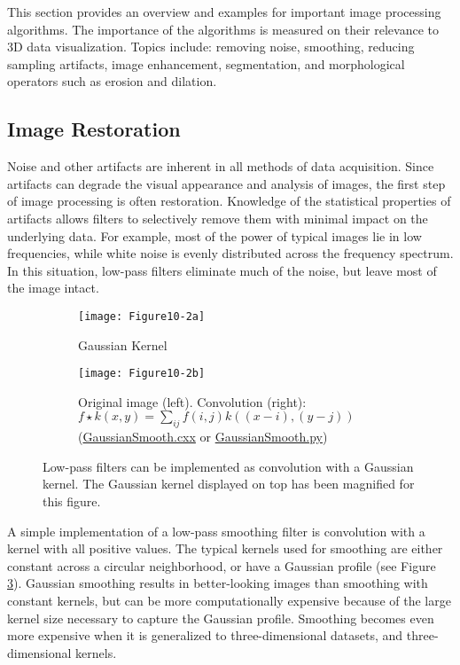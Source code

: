 This section provides an overview and examples for important image processing algorithms. The importance of the algorithms is measured on their relevance to 3D data visualization. Topics include: removing noise, smoothing, reducing sampling artifacts, image enhancement, segmentation, and morphological operators such as erosion and dilation.

\subsection{Image Restoration}

Noise and other artifacts are inherent in all methods of data acquisition. Since artifacts can degrade the visual appearance and analysis of images, the first step of image processing is often restoration. Knowledge of the statistical properties of artifacts allows filters to selectively remove them with minimal impact on the underlying data. For example, most of the power of typical images lie in low frequencies, while white noise is evenly distributed across the frequency spectrum. In this situation, low-pass filters eliminate much of the noise, but leave most of the image intact.

\begin{figure}[htb]
	\begin{subfigure}[h]{0.24\linewidth}
		\texttt{[image: Figure10-2a]}
		\captionsetup{justification=centering}
		\caption*{Gaussian Kernel}
		\label{fig:Figure10-2a}
	\end{subfigure}
	\hfill
	\begin{subfigure}[h]{0.98\linewidth}
		\texttt{[image: Figure10-2b]}
		\captionsetup{justification=centering}
		\caption*{Original image (left). Convolution (right):
         $f \star k(x,y) = \sum_{ij}f(i,j)k((x-i),(y-j))$\\ (\href{https://lorensen.github.io/VTKExamples/site/Cxx/ImageProcessing/GaussianSmooth/}{GaussianSmooth.cxx} or \href{https://lorensen.github.io/VTKExamples/site/Python/ImageProcessing/GaussianSmooth/}{GaussianSmooth.py})}
		\label{fig:Figure10-2b}
	\end{subfigure}
	\caption{Low-pass filters can be implemented as convolution with a Gaussian kernel. The Gaussian kernel displayed on top has been magnified for this figure.}\label{fig:Figure10-2}
\end{figure}

A simple implementation of a low-pass smoothing filter is convolution with a kernel with all positive values. The typical kernels used for smoothing are either constant across a circular neighborhood, or have a Gaussian profile (see Figure \ref{fig:Figure10-2}). Gaussian smoothing results in better-looking images than smoothing with constant kernels, but can be more computationally expensive because of the large kernel size necessary to capture the Gaussian profile. Smoothing becomes even more expensive when it is generalized to three-dimensional datasets, and three-dimensional kernels.

